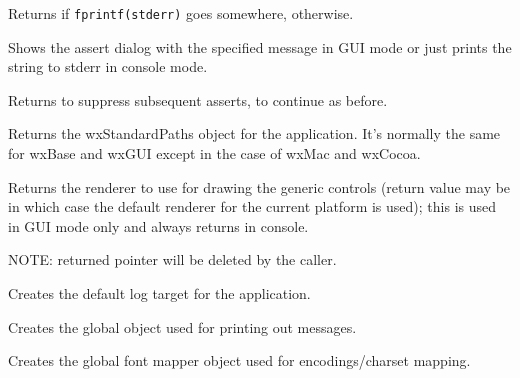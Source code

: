 \label{wxapptraitshasstderr}


Returns \true if {\tt fprintf(stderr)} goes somewhere, \false otherwise.



\label{wxapptraitsshowassertdialog}


Shows the assert dialog with the specified message in GUI mode or just prints
the string to stderr in console mode.

Returns \true to suppress subsequent asserts, \false to continue as before.



\label{wxapptraitsgetstandardpaths}


Returns the wxStandardPaths object for the application.
It's normally the same for wxBase and wxGUI except in the case of wxMac and wxCocoa.



\label{wxapptraitscreaterenderer}


Returns the renderer to use for drawing the generic controls (return value may be \NULL
in which case the default renderer for the current platform is used);
this is used in GUI mode only and always returns \NULL in console.

NOTE: returned pointer will be deleted by the caller.



\label{wxapptraitscreatelogtarget}


Creates the default log target for the application.



\label{wxapptraitscreatemessageoutput}


Creates the global object used for printing out messages.



\label{wxapptraitscreatefontmapper}


Creates the global font mapper object used for encodings/charset mapping.


